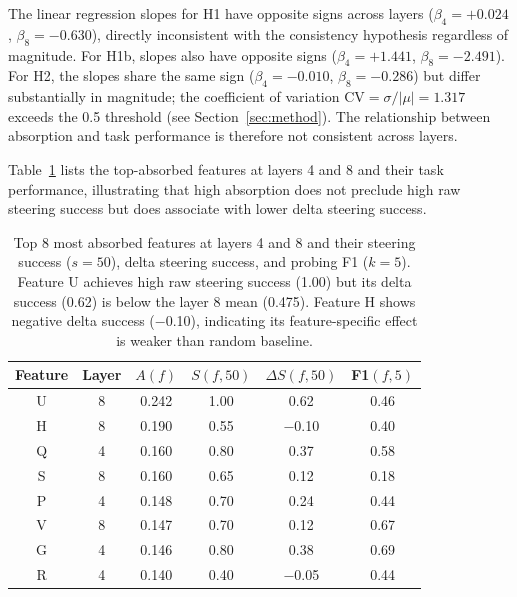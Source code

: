 \documentclass{article}
\begin{document}
The linear regression slopes for H1 have opposite signs across layers ($\beta_4 = +0.024$, $\beta_8 = -0.630$), directly inconsistent with the consistency hypothesis regardless of magnitude. For H1b, slopes also have opposite signs ($\beta_4 = +1.441$, $\beta_8 = -2.491$). For H2, the slopes share the same sign ($\beta_4 = -0.010$, $\beta_8 = -0.286$) but differ substantially in magnitude; the coefficient of variation $\text{CV} = \sigma / |\mu| = 1.317$ exceeds the 0.5 threshold (see Section~\ref{sec:method}). The relationship between absorption and task performance is therefore not consistent across layers.

Table~\ref{tab:top_features} lists the top-absorbed features at layers 4 and 8 and their task performance, illustrating that high absorption does not preclude high raw steering success but does associate with lower delta steering success.

\begin{table}[t]
\caption{Top 8 most absorbed features at layers 4 and 8 and their steering success ($s = 50$), delta steering success, and probing F1 ($k = 5$). Feature U achieves high raw steering success (1.00) but its delta success (0.62) is below the layer 8 mean (0.475). Feature H shows negative delta success ($-$0.10), indicating its feature-specific effect is weaker than random baseline.}
\label{tab:top_features}
\centering
\small
\begin{tabular}{@{}cccccc@{}}
\toprule
Feature & Layer & $A(f)$ & $S(f, 50)$ & $\Delta S(f, 50)$ & F1$(f, 5)$ \\
\midrule
U       & 8     & 0.242  & 1.00       & 0.62              & 0.46        \\
H       & 8     & 0.190  & 0.55       & $-$0.10           & 0.40        \\
Q       & 4     & 0.160  & 0.80       & 0.37              & 0.58        \\
S       & 8     & 0.160  & 0.65       & 0.12              & 0.18        \\
P       & 4     & 0.148  & 0.70       & 0.24              & 0.44        \\
V       & 8     & 0.147  & 0.70       & 0.12              & 0.67        \\
G       & 4     & 0.146  & 0.80       & 0.38              & 0.69        \\
R       & 4     & 0.140  & 0.40       & $-$0.05           & 0.44        \\
\bottomrule
\end{tabular}
\end{table}
\end{document}
